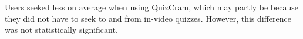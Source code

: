 \documentclass{sigchi}
\begin{document}

Users seeked less on average when using QuizCram, which may partly be because they did not have to seek to and from in-video quizzes. However, this difference was not statistically significant.






\end{document}
